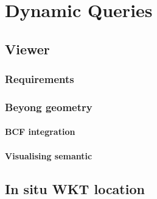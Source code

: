 \chapter{Dynamic Queries}

\section{Viewer}
\subsection{Requirements}

\subsection{Beyong geometry}

\subsubsection{BCF integration}

\subsubsection{Visualising semantic}

\section{In situ WKT location}



